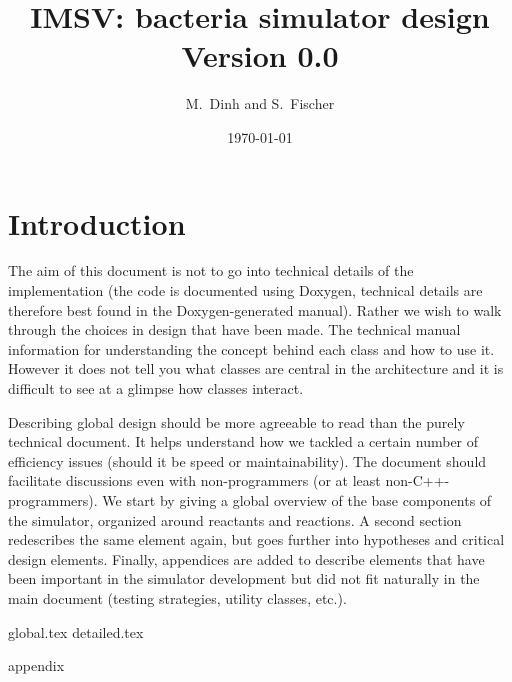 \documentclass[12pt]{scrartcl}
\theoremstyle{definition}
\theoremstyle{remark}
\numberwithin{equation}{section}
\begin{document}
\title{{IMSV}: bacteria simulator design \\ Version 0.0}%
\author{M.~Dinh and S.~Fischer}%
\date{\today}%
\maketitle

\newpage

\tableofcontents

\newpage

\section{Introduction}

The aim of this document is not to go into technical details of the implementation (the code is documented using Doxygen, technical details are therefore best found in the Doxygen-generated manual). Rather we wish to walk through the choices in design that have been made. The technical manual information for understanding the concept behind each class and how to use it. However it does not tell you what classes are central in the architecture and it is difficult to see at a glimpse how classes interact.

Describing global design should be more agreeable to read than the purely technical document. It helps understand how we tackled a certain number of efficiency issues (should it be speed or maintainability). The document should facilitate discussions even with non-programmers (or at least non-C++-programmers). We start by giving a global overview of the base components of the simulator, organized around reactants and reactions. A second section redescribes the same element again, but goes further into hypotheses and critical design elements. Finally, appendices are added to describe elements that have been important in the simulator development but did not fit naturally in the main document (testing strategies, utility classes, etc.).

{global.tex}
{detailed.tex}
\clearpage

\appendix
{appendix}
\clearpage
\end{document}
